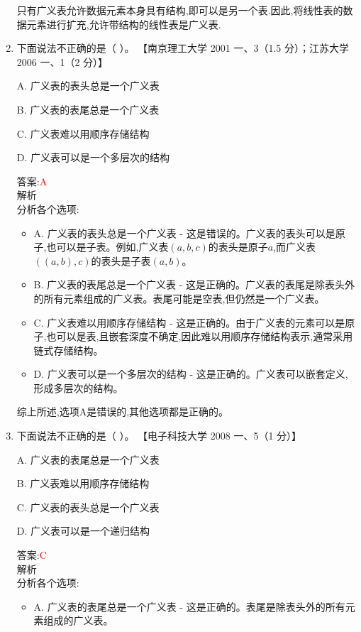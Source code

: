 \documentclass[lang=cn,newtx,10pt,scheme=chinese]{../elegantbook}
\begin{document}
\begin{enumerate}
    只有广义表允许数据元素本身具有结构,即可以是另一个表.因此,将线性表的数据元素进行扩充,允许带结构的线性表是广义表.\\

    \item 下面说法不正确的是（ ）。  
    【南京理工大学 2001 一、3（1.5 分）；江苏大学 2006 一、1（2 分）】 

    A. 广义表的表头总是一个广义表  

    B. 广义表的表尾总是一个广义表  


    C. 广义表难以用顺序存储结构  

    D. 广义表可以是一个多层次的结构  
    
    答案:\textcolor{red}{A}\\
    解析\\
    分析各个选项:
    \begin{itemize}
        \item A. 广义表的表头总是一个广义表 - 这是错误的。广义表的表头可以是原子,也可以是子表。例如,广义表$(a, b, c)$的表头是原子$a$,而广义表$((a, b), c)$的表头是子表$(a, b)$。
        
        \item B. 广义表的表尾总是一个广义表 - 这是正确的。广义表的表尾是除表头外的所有元素组成的广义表。表尾可能是空表,但仍然是一个广义表。
        
        \item C. 广义表难以用顺序存储结构 - 这是正确的。由于广义表的元素可以是原子,也可以是表,且嵌套深度不确定,因此难以用顺序存储结构表示,通常采用链式存储结构。
        
        \item D. 广义表可以是一个多层次的结构 - 这是正确的。广义表可以嵌套定义,形成多层次的结构。
    \end{itemize}
    
    综上所述,选项A是错误的,其他选项都是正确的。\\

    \item 下面说法不正确的是（ ）。  
    【电子科技大学 2008 一、5（1 分）】  

    A. 广义表的表尾总是一个广义表  

    B. 广义表难以用顺序存储结构  

    C. 广义表的表头总是一个广义表  

    D. 广义表可以是一个递归结构  
    
    答案:\textcolor{red}{C}\\
    解析\\
    分析各个选项:
    \begin{itemize}
        \item A. 广义表的表尾总是一个广义表 - 这是正确的。表尾是除表头外的所有元素组成的广义表。
        

\end{itemize}
\end{enumerate}
\end{document}
